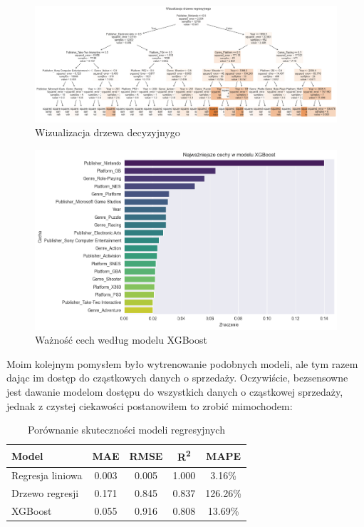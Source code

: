 \documentclass[11pt]{article}
\begin{document}
\begin{figure}[H]
    \centering
    \includegraphics[width=0.9\linewidth]{figures/drzewo1}
    \caption{Wizualizacja drzewa decyzyjnygo}
    \label{fig:tree1}
\end{figure}

\begin{figure}[H]
    \centering
    \includegraphics[width=0.9\linewidth]{figures/xgboost1}
    \caption{Ważność cech według modelu XGBoost}
    \label{fig:xgb_importance1}
\end{figure}


Moim kolejnym pomysłem było wytrenowanie podobnych modeli, ale tym razem dając im dostęp do cząstkowych danych o sprzedaży.
Oczywiście, bezsensowne jest dawanie modelom dostępu do wszystkich danych o cząstkowej sprzedaży, jednak z czystej ciekawości postanowiłem to zrobić mimochodem:

\begin{table}[H]
\centering
\begin{tabular}{|l|c|c|c|c|}
\hline
\textbf{Model} & \textbf{MAE} & \textbf{RMSE} & \textbf{R\textsuperscript{2}} & \textbf{MAPE} \\
\hline
Regresja liniowa & 0.003 & 0.005 & 1.000 & 3.16\% \\
Drzewo regresji  & 0.171 & 0.845 & 0.837 & 126.26\% \\
XGBoost          & 0.055 & 0.916 & 0.808 & 13.69\% \\
\hline
\end{tabular}
\caption{Porównanie skuteczności modeli regresyjnych}
\label{tab:model_comparison2}
\end{table}
\end{document}
